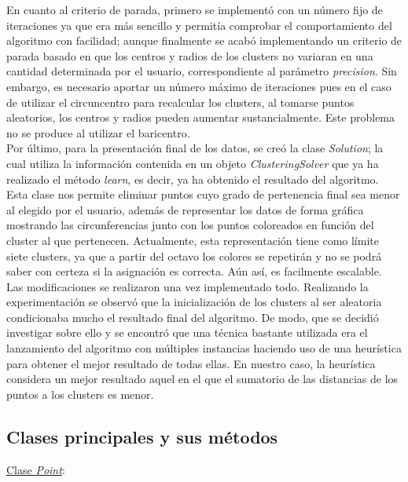 \documentclass[conference,a4paper]{IEEEtran}
\begin{document}
En cuanto al criterio de parada, primero se implementó con un número fijo de iteraciones ya que era más sencillo y permitía comprobar el comportamiento del algoritmo con facilidad; aunque finalmente se acabó implementando un criterio de parada basado en que los centros y radios de los clusters no variaran en una cantidad determinada por el usuario, correspondiente al parámetro \textit{precision}. Sin embargo, es necesario aportar un número máximo de iteraciones pues en el caso de utilizar el circuncentro para recalcular los clusters, al tomarse puntos aleatorios, los centros y radios pueden aumentar sustancialmente. Este problema no se produce al utilizar el baricentro.\\

Por último, para la presentación final de los datos, se creó la clase  \textit{Solution}; la cual utiliza la información contenida en un objeto \textit{ClusteringSolver} que ya ha realizado el método  \textit{learn}, es decir, ya ha obtenido el resultado del algoritmo. Esta clase nos permite eliminar puntos cuyo grado de pertenencia final sea menor al elegido por el usuario, además de representar los datos de forma gráfica mostrando las circunferencias junto con los puntos coloreados en función del cluster al que pertenecen. Actualmente, esta representación tiene como límite siete clusters, ya que a partir del octavo los colores se repetirán y no se podrá saber con certeza si la asignación es correcta. Aún así, es facilmente escalable.\\

Las modificaciones se realizaron una vez implementado todo. Realizando la experimentación se observó que la inicialización de los clusters al ser aleatoria condicionaba mucho el resultado final del algoritmo. De modo, que se decidió investigar sobre ello y se encontró que una técnica bastante utilizada era el lanzamiento del algoritmo con múltiples instancias haciendo uso de una heurística para obtener el mejor resultado de todas ellas. En nuestro caso, la heurística  considera un mejor resultado aquel en el que el sumatorio de las distancias de los puntos a los clusters es menor.\\

\subsection{Clases principales y sus métodos}

\underline{Clase \textit{Point}}:\\
\end{document}
